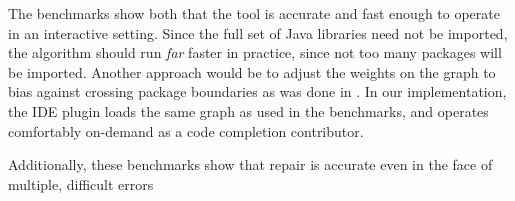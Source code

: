The benchmarks show both that the tool is accurate and fast enough to operate in an interactive setting. Since the full set of Java libraries need not be imported, the algorithm should run \textit{far} faster in practice, since not too many packages will be imported. Another approach would be to adjust the weights on the graph to bias against crossing package boundaries as was done in \citep{MandelinetALL2005Jungloid}. In our implementation, the IDE plugin loads the same graph as used in the benchmarks, and operates comfortably on-demand as a code completion contributor.

Additionally, these benchmarks show that repair is accurate even in the face of multiple, difficult errors